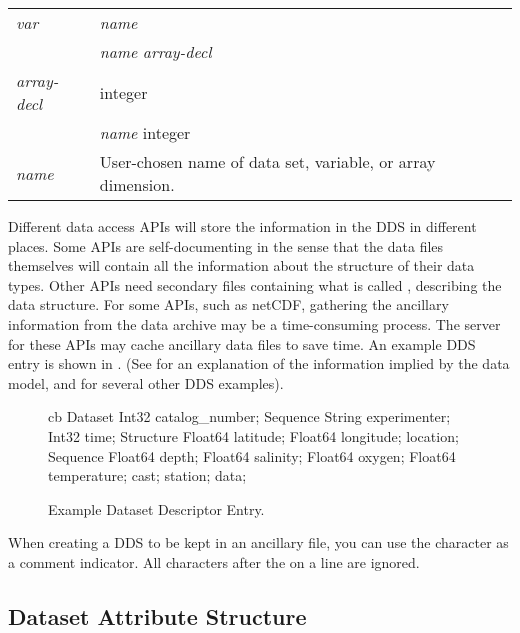 \begin{table}[htbp]
\begin{center}
\begin{tabular}{|l|l|}
{\em var\/}     & {\em name} \\ 
                & {\em name} {\em array-decl\/} \\  \hline

{\em array-decl\/} & \lit{[} integer \lit{]} \\ 
                   & \lit{[} {\em name} \lit{=} integer \lit{]} \\  \hline

{\em name\/}    & User-chosen name of data set, variable, 
                  or array dimension. \\  \hline
\end{tabular}
\end{center}
\normalsize
\end{table}

Different data access APIs will store the information in the DDS in
different places. Some APIs are self-documenting in the sense that the
data files themselves will contain all the information about the
structure of their data types. Other APIs need secondary files
containing what is called , describing the data
structure. For some APIs, such as netCDF, gathering the ancillary
information from the data archive may be a time-consuming process. The
\opendap server for these APIs may cache ancillary data files to save
time.  An example DDS entry is shown in . (See
 for an explanation of the information implied
by the data model, and for several other DDS examples).

\begin{figure}[htbp]
\W\label{data,fig,dds}
\begin{vcode}{cb}
Dataset { 
  Int32 catalog_number;
  Sequence {
    String experimenter;
    Int32 time;
    Structure {
      Float64 latitude;
      Float64 longitude;
    } location;
    Sequence {
      Float64 depth;
      Float64 salinity;
      Float64 oxygen;
      Float64 temperature;
    } cast;
  } station;
} data;
\end{vcode}
\caption{Example Dataset Descriptor Entry.}
\T\label{data,fig,dds}
\end{figure}

When creating a DDS to be kept in an ancillary file, you can use the
\lit{\#} character as a comment indicator.  All characters after the
\lit{\#} on a line are ignored.\indc{\#}

\subsection{Dataset Attribute Structure}
\label{data,das}

